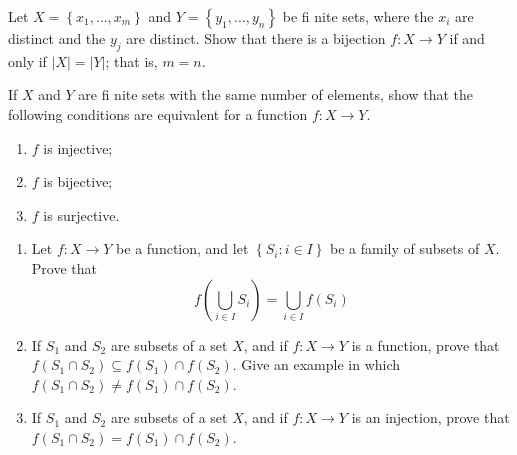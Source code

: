\begin{questions}
\begin{enumerate}[label=(\alph*)]
\end{enumerate}


\begin{solution}
    
\end{solution}


\question
    Let \(X=\left\{x_1, \ldots, x_m\right\}\) and \(Y=\left\{y_1, \ldots, y_n\right\}\) be fi nite sets, where the \(x_i\) are distinct and the \(y_j\) are distinct. Show that there is a bijection \(f: X \rightarrow Y\) if and only if \(|X|=|Y|\); that is, \(m=n\).


\begin{solution}
    
\end{solution}


    If \(X\) and \(Y\) are fi nite sets with the same number of elements, show that the following conditions are equivalent for a function \(f: X \rightarrow Y\).
    \begin{enumerate}[label=(\alph*)]
        \item \(f\) is injective;
        \item \(f\) is bijective;
        \item \(f\) is surjective.
    \end{enumerate}



\begin{solution}
    
\end{solution}


\question
    \begin{enumerate}[label=(\alph*)]
        \item Let \(f: X \rightarrow Y\) be a function, and let \(\left\{S_i: i \in I\right\}\) be a family of subsets of \(X\). Prove that
\[
f\left(\bigcup_{i \in I} S_i\right)=\bigcup_{i \in I} f\left(S_i\right)
\]

        \item If \(S_1\) and \(S_2\) are subsets of a set \(X\), and if \(f: X \rightarrow Y\) is a function, prove that \(f\left(S_1 \cap S_2\right) \subseteq f\left(S_1\right) \cap f\left(S_2\right)\). Give an example in which \(f\left(S_1 \cap S_2\right) \neq f\left(S_1\right) \cap f\left(S_2\right)\).
        
        \item If \(S_1\) and \(S_2\) are subsets of a set \(X\), and if \(f: X \rightarrow Y\) is an injection, prove that \(f\left(S_1 \cap S_2\right)=f\left(S_1\right) \cap f\left(S_2\right)\).
    \end{enumerate}



\end{questions}

